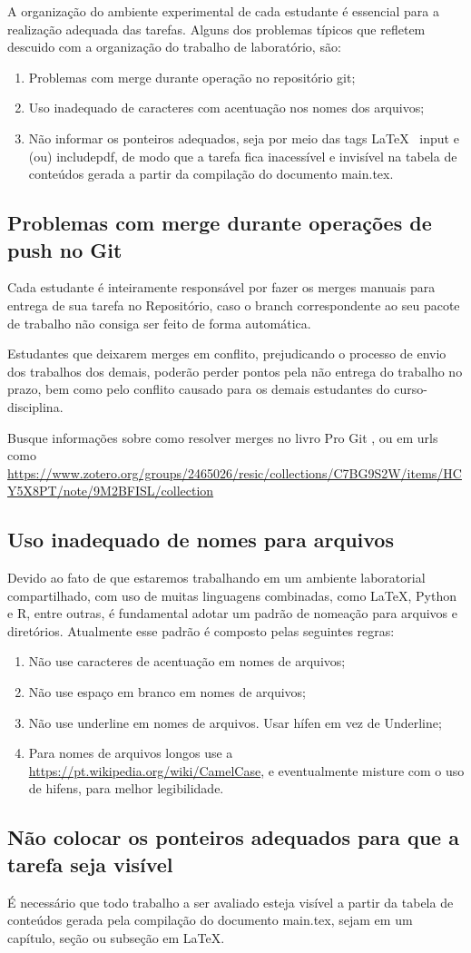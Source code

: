 A organização do ambiente experimental de cada estudante é essencial para a realização adequada das tarefas.
Alguns dos problemas típicos que refletem descuido com a organização do trabalho de laboratório, são:

\begin{enumerate}
\item Problemas com merge durante operação no repositório git;
\item Uso inadequado de caracteres com acentuação nos nomes dos arquivos;
\item Não informar os ponteiros adequados, seja por meio das tags \LaTeX~ input e (ou) includepdf, de modo que a tarefa fica inacessível e invisível na tabela de conteúdos gerada a partir da compilação do documento main.tex.
\end{enumerate}

\subsection{Problemas com merge durante operações de push no Git}

Cada estudante é inteiramente responsável por fazer os merges manuais para entrega de sua tarefa no Repositório, caso o branch correspondente ao seu pacote de trabalho não consiga ser feito de forma automática. 

Estudantes que deixarem merges em conflito, prejudicando o processo de envio dos trabalhos dos demais, poderão perder pontos pela não entrega do trabalho no prazo, bem como pelo conflito causado para os demais estudantes do curso-disciplina. 

Busque informações sobre como resolver merges no livro Pro Git \cite{chacon_pro_2014}, ou em  urls como \url{https://www.zotero.org/groups/2465026/resic/collections/C7BG9S2W/items/HCY5X8PT/note/9M2BFISL/collection}

\subsection{Uso inadequado de nomes para arquivos}

Devido ao fato de que estaremos trabalhando em um ambiente laboratorial compartilhado, com uso de muitas linguagens combinadas, como \LaTeX, Python e R, entre outras, é fundamental adotar um padrão de nomeação para arquivos e diretórios. Atualmente esse padrão é composto pelas seguintes regras:
\begin{enumerate}
    \item Não use caracteres de acentuação em nomes de arquivos;
    \item Não use espaço em branco em nomes de arquivos;
    \item Não use underline em nomes de arquivos. Usar hífen em vez de Underline;
    \item Para nomes de arquivos longos use a \url{https://pt.wikipedia.org/wiki/CamelCase}, e eventualmente misture com o uso de hifens, para melhor legibilidade.
\end{enumerate}

\subsection{Não colocar os ponteiros adequados para que a tarefa seja visível}

É necessário que todo trabalho a ser avaliado esteja visível a partir da tabela de conteúdos gerada pela compilação do documento main.tex, sejam em um capítulo, seção ou subseção em \LaTeX.

